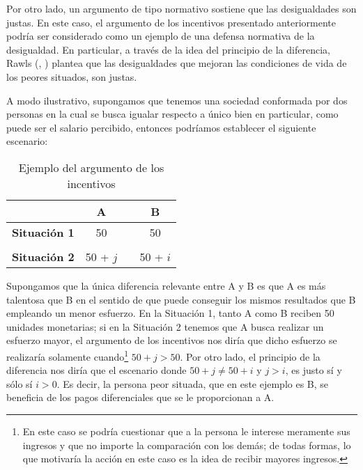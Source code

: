 Por otro lado, un argumento de tipo normativo sostiene que las desigualdades son justas. En este caso, el argumento de los incentivos presentado anteriormente podría ser considerado como un ejemplo de una defensa normativa de la desigualdad. En particular, a través de la idea del principio de la diferencia, Rawls (\citeyear{Rawls_1971}, \citeyear{Rawls_2002}) plantea que las desigualdades que mejoran las condiciones de vida de los peores situados, son justas.

A modo ilustrativo, supongamos que tenemos una sociedad conformada por dos personas en la cual se busca igualar respecto a único bien en particular, como puede ser el salario percibido, entonces podríamos establecer el siguiente escenario:


\vspace{3mm}
\begin{table}[H]
\caption{Ejemplo del argumento de los incentivos}
\centering
\begin{tabular}{ccc|c}
                     & \textbf{A} & \textbf{} & \textbf{B} \\ \hline
\textbf{Situación 1} & 50         &           & 50         \\
\textbf{}            &            &           &            \\
\textbf{Situación 2} & 50 + $j$     &           & 50 + $i$    
\end{tabular}
\end{table}
\vspace{3mm}





Supongamos que la única diferencia relevante entre A y B es que A es más talentosa que B en el sentido de que puede conseguir los mismos resultados que B empleando un menor esfuerzo. En la Situación 1, tanto A como B reciben 50 unidades monetarias; si en la Situación 2 tenemos que A busca realizar un esfuerzo mayor, el argumento de los incentivos nos diría que dicho esfuerzo se realizaría solamente cuando\footnote{En este caso se podría cuestionar que a la persona le interese meramente sus ingresos y que no importe la comparación con los demás; de todas formas, lo que motivaría la acción en este caso es la idea de recibir mayores ingresos.} $50 + j > 50$. Por otro lado, el principio de la diferencia nos diría que el escenario donde $50 + j \neq 50 + i$ y $j > i$, es justo sí y sólo sí $i > 0$. Es decir, la persona peor situada, que en este ejemplo es B, se beneficia de los pagos diferenciales que se le proporcionan a A. 

